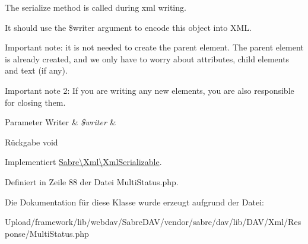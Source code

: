 The serialize method is called during xml writing.

It should use the \$writer argument to encode this object into X\+ML.

Important note\+: it is not needed to create the parent element. The parent element is already created, and we only have to worry about attributes, child elements and text (if any).

Important note 2\+: If you are writing any new elements, you are also responsible for closing them.


\begin{DoxyParams}[1]{Parameter}
Writer & {\em \$writer} & \\
\hline
\end{DoxyParams}
\begin{DoxyReturn}{Rückgabe}
void 
\end{DoxyReturn}


Implementiert \mbox{\hyperlink{interface_sabre_1_1_xml_1_1_xml_serializable_aa78f3ee43aa699be8347181653a53d8c}{Sabre\textbackslash{}\+Xml\textbackslash{}\+Xml\+Serializable}}.



Definiert in Zeile 88 der Datei Multi\+Status.\+php.



Die Dokumentation für diese Klasse wurde erzeugt aufgrund der Datei\+:\begin{DoxyCompactItemize}
\item 
Upload/framework/lib/webdav/\+Sabre\+D\+A\+V/vendor/sabre/dav/lib/\+D\+A\+V/\+Xml/\+Response/Multi\+Status.\+php\end{DoxyCompactItemize}
